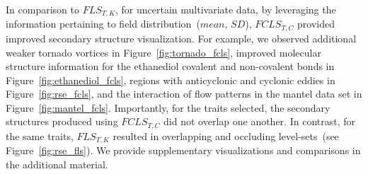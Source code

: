 In comparison to $FLS_{T,K}$, for uncertain multivariate data, by leveraging the information pertaining to field distribution~($mean$, $SD$), $FCLS_{T,C}$ provided improved secondary structure visualization.
%
For example, we observed additional weaker tornado vortices in Figure~\ref{fig:tornado_fcls}, improved molecular structure information for the ethanediol covalent and non-covalent bonds in Figure~\ref{fig:ethanediol_fcls}, regions with anticyclonic and cyclonic eddies in Figure~\ref{fig:rse_fcls}, and the interaction of flow patterns in the mantel data set in Figure~\ref{fig:mantel_fcls}.
%
Importantly, for the traits selected, the secondary structures produced using $FCLS_{T,C}$ did not overlap one another.
%
In contrast, for the same traits, $FLS_{T,K}$ resulted in overlapping and occluding level-sets~(see Figure~\ref{fig:rse_fls}).
%
We provide supplementary visualizations and comparisons in the additional material. 
 





